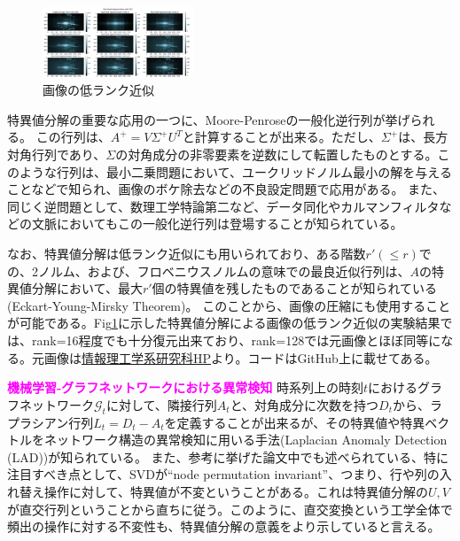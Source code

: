 \documentclass[10pt]{article}
\begin{document}
\begin{figure}
    \vspace{-1.5\baselineskip}
    \begin{center}
        \includegraphics[width=0.4\textwidth]{RowRankImage.png}
        \caption{画像の低ランク近似}
        \label{img:RowRankImage}
    \end{center}
    \vspace{-1.5\baselineskip}
\end{figure}

特異値分解の重要な応用の一つに、Moore-Penroseの一般化逆行列が挙げられる。
この行列は、$A^+ = V \Sigma^+ U^T$と計算することが出来る。ただし、$\Sigma^+$は、長方対角行列であり、$\Sigma$の対角成分の非零要素を逆数にして転置したものとする。このような行列は、最小二乗問題において、ユークリッドノルム最小の解を与えることなどで知られ、画像のボケ除去などの不良設定問題で応用がある。
また、同じく逆問題として、数理工学特論第二など、データ同化やカルマンフィルタなどの文脈においてもこの一般化逆行列は登場することが知られている\cite{GengJieNiWenTitositeno4CiYuandetaTongHua2020}。

なお、特異値分解は低ランク近似にも用いられており、ある階数$r'(\leq r)$での、2ノルム、および、フロベニウスノルムの意味での最良近似行列は、$A$の特異値分解において、最大$r'$個の特異値を残したものであることが知られている(Eckart-Young-Mirsky Theorem)\cite{wilkinsonLowrankApproximationMultivariate}。
このことから、画像の圧縮にも使用することが可能である。Fig\ref{img:RowRankImage}に示した特異値分解による画像の低ランク近似の実験結果では、rank=16程度でも十分復元出来ており、rank=128では元画像とほぼ同等になる。元画像は\href{https://www.i.u-tokyo.ac.jp/}{情報理工学系研究科HP}より。コードはGitHub上に載せてある\cite{hamaguchiApplyingForGraduateSchool2023}。

\noindent
{\bf \textcolor{magenta}{機械学習-グラフネットワークにおける異常検知}}\quad
時系列上の時刻$t$におけるグラフネットワーク$\mathcal{G}_t$に対して、隣接行列$A_t$と、対角成分に次数を持つ$D_t$から、ラプラシアン行列$L_t=D_t-A_t$を定義することが出来るが、その特異値や特異ベクトルをネットワーク構造の異常検知に用いる手法(Laplacian Anomaly Detection (LAD))が知られている\cite{huangLaplacianChangePoint2020}。
また、参考に挙げた論文中でも述べられている、特に注目すべき点として、SVDが``node permutation invariant''、つまり、行や列の入れ替え操作に対して、特異値が不変ということがある。これは特異値分解の$U,V$が直交行列ということから直ちに従う。このように、直交変換という工学全体で頻出の操作に対する不変性も、特異値分解の意義をより示していると言える。
\end{document}
